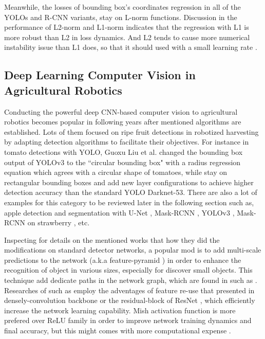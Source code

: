 \documentclass[default,pdflatex,iicol]{sn-jnl}%
\begin{document}
Meanwhile, the losses of bounding box's coordinates regression in all of the YOLOs and R-CNN variants, stay on L-norm functions. Discussion in the performance of L2-norm and L1-norm indicates that the regression with L1 is more robust than L2 in loss dynamics. And L2 tends to cause more numerical instability issue than L1 does, so that it should used with a small learning rate \cite{fastrcnn}.

\subsection{Deep Learning Computer Vision in Agricultural Robotics}
Conducting the powerful deep CNN-based computer vision to agricultural robotics becomes popular in following years after mentioned algorithms are established. Lots of them focused on ripe fruit detections in robotized harvesting by adapting detection algorithms to facilitate their objectives. For instance in tomato detections with YOLO, Guoxu Liu et al. \cite{s20072145} changed the bounding box output of YOLOv3 to the ``circular bounding box" with a radius regression equation which agrees with a circular shape of tomatoes, while \cite{Lawal_2021, chentomato} stay on rectangular bounding boxes and add new layer configurations to achieve higher detection accuracy than the standard YOLO Darknet-53. There are also a lot of examples for this category to be reviewed later in the following section such as, apple detection and segmentation with U-Net \cite{Li2021apple}, Mask-RCNN \cite{Chu2021apple, Jia2020apple}, YOLOv3 \cite{Kuznetsova2020apple}, Mask-RCNN on strawberry \cite{Yu2019strawberry}, etc.

Inspecting for details on the mentioned works that how they did the modifications on standard detector networks, a popular mod is to add multi-scale predictions to the network (a.k.a feature-pyramid \cite{Tong2020}) in order to enhance the recognition of object in various sizes, especially for discover small objects. This technique add dedicate paths in the network graph, which are found in such as \cite{chentomato, Lawal_2021, Yu2019strawberry, Li2021apple}. Researches of such as \cite{Jia2020apple, Chu2021apple, Yu2019strawberry, Lawal2021tomato} employ the adventages of feature re-use that presented in densely-convolution backbone \cite{densenet} or the residual-block of ResNet \cite{resnet}, which efficiently increase the network learning capability. Mish activation function is more prefered over ReLU family in order to improve network training dynamics and final accuracy, but this might comes with more computational expense \cite{misra2019mish}.
\end{document}
